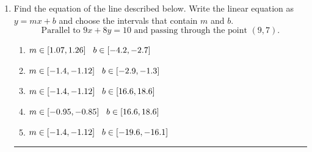 \documentclass[14pt]{extbook}
\newcommand{\litem}[1]{\item#1\hspace*{-1cm}\rule{\textwidth}{0.4pt}}
\begin{document}
\begin{enumerate}
{\begin{enumerate}[label=\Alph*.]
\end{enumerate} }
\litem{
Find the equation of the line described below. Write the linear equation as $ y=mx+b $ and choose the intervals that contain $m$ and $b$.\[ \text{Parallel to } 9 x + 8 y = 10 \text{ and passing through the point } (9, 7). \]\begin{enumerate}[label=\Alph*.]
\item \( m \in [1.07, 1.26] \hspace*{3mm} b \in [-4.2, -2.7] \)
\item \( m \in [-1.4, -1.12] \hspace*{3mm} b \in [-2.9, -1.3] \)
\item \( m \in [-1.4, -1.12] \hspace*{3mm} b \in [16.6, 18.6] \)
\item \( m \in [-0.95, -0.85] \hspace*{3mm} b \in [16.6, 18.6] \)
\item \( m \in [-1.4, -1.12] \hspace*{3mm} b \in [-19.6, -16.1] \)

\end{enumerate} }
\end{enumerate}
\end{document}
